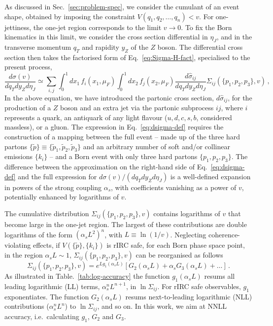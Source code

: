 As discussed in Sec.~\ref{sec:problem-spec}, we consider the cumulant of
an event shape, obtained by imposing the constraint
$V(q_1,q_2,\dots,q_n)<v$. For one-jettiness, the one-jet region corresponds
to the limit $v\to0$. To fix the Born kinematics in this limit, we
consider the cross section differential in $\eta_J$, and in the transverse momentum $q_T$ 
and rapidity $y_Z$ of the $Z$ boson. The differential cross section then takes the factorised form
of Eq.~\eqref{eq:Sigma-H-fact}, specialised to the present process, 
\begin{equation}
  \label{eq:dsigma-def}
  \frac{d\sigma(v)}{dq_T dy_Zd\eta_J} \simeq \sum_{i,j} \int_0^1 \!\! dx_1\, f_i(x_1,\mu_F)\int_0^1 \!\! dx_2\, f_j(x_2,\mu_F)\frac{d\hat \sigma_{ij}}{dq_Tdy_Zd\eta_J} \Sigma_{ij}(\{p_1,p_2,p_3\},v)\,,
\end{equation}
In the above equation, we have introduced the partonic cross section, $d\hat{\sigma}_{ij}$,
for the production of a $Z$ boson and an extra jet via the partonic
subprocess $ij$, where $i$ represents a quark, an antiquark of any
light flavour ($u,d,c,s,b$, considered massless), or a gluon. 
The expression in Eq.~\eqref{eq:dsigma-def}
requires the construction of a mapping between the full event -- made up
of the three hard partons $\{\tilde p\}\equiv\{\tilde p_1,\tilde p_2,\tilde p_3\}$ and an arbitrary number of soft and/or collinear emissions $\{k_i\}$ -- and
a Born event with only three hard partons $\{p_1,p_2,p_3\}$.  
The difference between the approximation on the right-hand side of
Eq.~\eqref{eq:dsigma-def} and the full expression for
$ d\sigma(v)/(dq_T dy_Z d\eta_J)$ is a well-defined expansion in powers of the
strong coupling $\alpha_s$, with coefficients vanishing as a power of
$v$, potentially enhanced by logarithms of $v$.

The cumulative distribution $\Sigma_{ij}(\{p_1,p_2,p_3\},v)$ contains
logarithms of $v$ that become large in the one-jet region. The
largest of these contributions are double logarithms of the form
$(\alpha_s L^2)^n$, with $L\equiv \ln(1/v)$. Neglecting 
coherence-violating effects, if $V(\{\tilde p\},\{k_i\})$ is rIRC
safe, for each Born phase space point, in the region
$\alpha_s L\sim 1$, $\Sigma_{ij}(\{p_1,p_2,p_3\},v)$ can be
reorganised as follows
\begin{equation}
  \label{eq:log-counting}
  \Sigma_{ij}(\{p_1,p_2,p_3\},v) = e^{L g_1(\alpha_s L)}\left[G_2(\alpha_s L)+ \alpha_s G_3(\alpha_s L)+\dots\right]\,.
\end{equation}
As illustrated in Table.~\ref{tab:log-accuracy} the function $g_1(\alpha_s L)$ resums all leading logarithmic (LL)
terms, $\alpha_s^n L^{n+1}$, in $\ln\Sigma_{ij}$. For rIRC safe
observables, $g_1$ exponentiates. The function $G_2(\alpha_s L)$
resums next-to-leading logarithmic (NLL) contributions
($\alpha_s^n L^n$) to $\ln\Sigma_{ij}$, and so on. In this work, we
aim at NNLL accuracy, i.e.\ calculating $g_1$, $G_2$ and $G_3$. 


